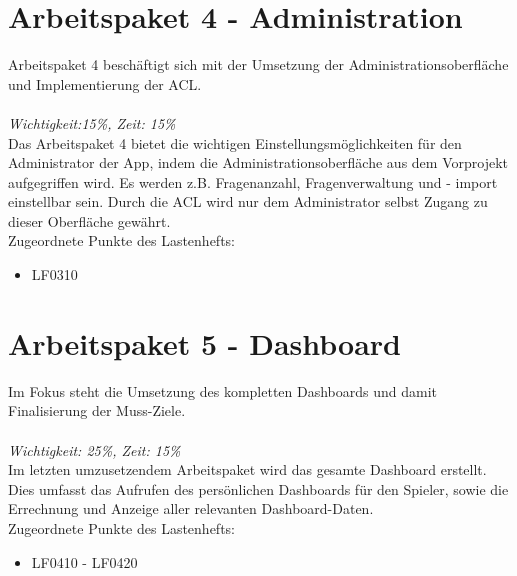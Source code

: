 \documentclass[11pt,a4paper]{scrreprt}
\begin{document}
\section{Arbeitspaket 4 - Administration}
Arbeitspaket 4 beschäftigt sich mit der Umsetzung der Administrationsoberfläche und Implementierung der ACL. \\ \\
\textit{Wichtigkeit:15\%, Zeit: 15\%} \\
Das Arbeitspaket 4 bietet die wichtigen Einstellungsmöglichkeiten für den Administrator der App, indem die Administrationsoberfläche aus dem Vorprojekt aufgegriffen wird. Es werden z.B. Fragenanzahl, Fragenverwaltung und - import einstellbar sein. Durch die ACL wird nur dem Administrator selbst Zugang zu dieser Oberfläche gewährt.\\
Zugeordnete Punkte des Lastenhefts:
\begin{itemize}
\item LF0310
\end{itemize}

\section{Arbeitspaket 5 - Dashboard}
Im Fokus steht die Umsetzung des kompletten Dashboards und damit Finalisierung der Muss-Ziele. \\ \\
\textit{Wichtigkeit: 25\%, Zeit: 15\%} \\
Im letzten umzusetzendem Arbeitspaket wird das gesamte Dashboard erstellt. Dies umfasst das Aufrufen des persönlichen Dashboards für den Spieler, sowie die Errechnung und Anzeige aller relevanten Dashboard-Daten.\\
Zugeordnete Punkte des Lastenhefts:
\begin{itemize}
\item LF0410 - LF0420
\end{itemize}
\end{document}
